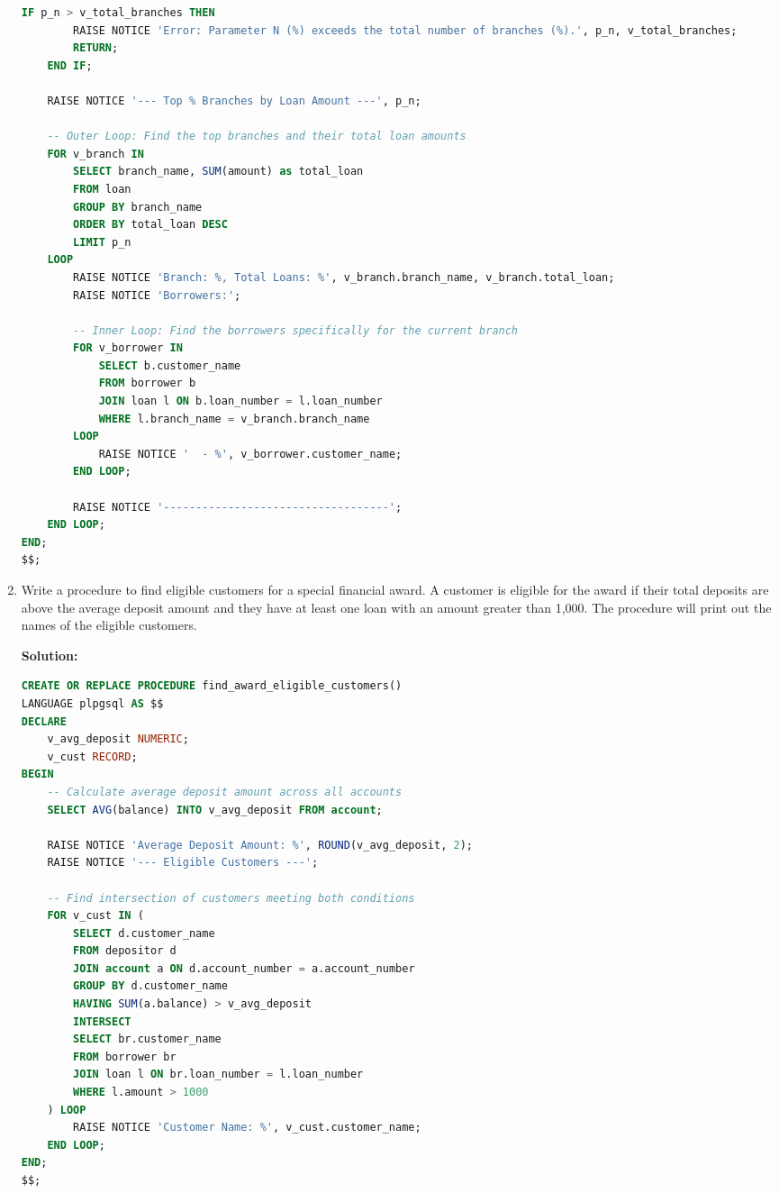\documentclass[12pt,a4paper]{article}
\newif\ifshowsolutions
\begin{document}
\begin{enumerate}
\begin{lstlisting}[language=SQL]
    IF p_n > v_total_branches THEN
        RAISE NOTICE 'Error: Parameter N (%) exceeds the total number of branches (%).', p_n, v_total_branches;
        RETURN;
    END IF;
    
    RAISE NOTICE '--- Top % Branches by Loan Amount ---', p_n;
    
    -- Outer Loop: Find the top branches and their total loan amounts
    FOR v_branch IN 
        SELECT branch_name, SUM(amount) as total_loan
        FROM loan
        GROUP BY branch_name
        ORDER BY total_loan DESC
        LIMIT p_n
    LOOP
        RAISE NOTICE 'Branch: %, Total Loans: %', v_branch.branch_name, v_branch.total_loan;
        RAISE NOTICE 'Borrowers:';
        
        -- Inner Loop: Find the borrowers specifically for the current branch
        FOR v_borrower IN 
            SELECT b.customer_name
            FROM borrower b
            JOIN loan l ON b.loan_number = l.loan_number
            WHERE l.branch_name = v_branch.branch_name
        LOOP
            RAISE NOTICE '  - %', v_borrower.customer_name;
        END LOOP;
        
        RAISE NOTICE '-----------------------------------';
    END LOOP;
END;
$$;
    \end{lstlisting}
    \fi

    \item Write a procedure to find eligible customers for a special financial award. A customer is eligible for the award if their total deposits are above the average deposit amount and they have at least one loan with an amount greater than 1,000. The procedure will print out the names of the eligible customers.

    \ifshowsolutions
    \textbf{Solution:}
    \begin{lstlisting}[language=SQL]
CREATE OR REPLACE PROCEDURE find_award_eligible_customers()
LANGUAGE plpgsql AS $$
DECLARE
    v_avg_deposit NUMERIC;
    v_cust RECORD;
BEGIN
    -- Calculate average deposit amount across all accounts
    SELECT AVG(balance) INTO v_avg_deposit FROM account;

    RAISE NOTICE 'Average Deposit Amount: %', ROUND(v_avg_deposit, 2);
    RAISE NOTICE '--- Eligible Customers ---';

    -- Find intersection of customers meeting both conditions
    FOR v_cust IN (
        SELECT d.customer_name
        FROM depositor d
        JOIN account a ON d.account_number = a.account_number
        GROUP BY d.customer_name
        HAVING SUM(a.balance) > v_avg_deposit
        INTERSECT
        SELECT br.customer_name
        FROM borrower br
        JOIN loan l ON br.loan_number = l.loan_number
        WHERE l.amount > 1000
    ) LOOP
        RAISE NOTICE 'Customer Name: %', v_cust.customer_name;
    END LOOP;
END;
$$;


\end{lstlisting}
\end{enumerate}
\end{document}
